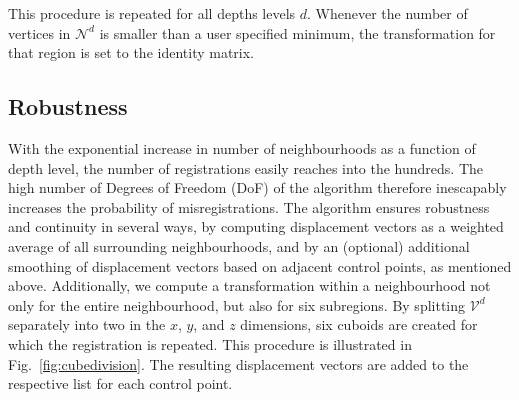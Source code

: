 This procedure is repeated for all depths levels $d$. Whenever the number of vertices in $\mathcal{N}^{d}$ is smaller than a user specified minimum, the transformation for that region is set to the identity matrix. 

\subsection{Robustness}
\label{sec:robustness}
With the exponential increase in number of neighbourhoods as a function of depth level, the number of registrations easily reaches into the hundreds. The high number of Degrees of Freedom (DoF) of the algorithm therefore inescapably increases the probability of misregistrations. The algorithm ensures robustness and continuity in several ways, by computing displacement vectors as a weighted average of all surrounding neighbourhoods, and by an (optional) additional smoothing of displacement vectors based on adjacent control points, as mentioned above. Additionally, we compute a transformation within a neighbourhood not only for the entire neighbourhood, but also for six subregions. By splitting $\mathcal{V}^{d}$ separately into two in the $x$, $y$, and $z$ dimensions, six cuboids are created for which the registration is repeated. This procedure is  illustrated in Fig.~\ref{fig:cubedivision}. The resulting displacement vectors are added to the respective list for each control point. 


